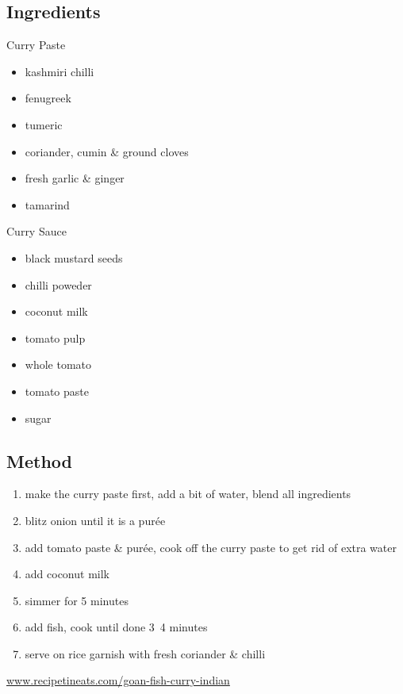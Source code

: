\documentclass[11pt,a4paper]{article}
\begin{document}
\subsection*{Ingredients}

\begin{multicols}{2}

Curry Paste

\begin{itemize}
  \item kashmiri chilli
  \item fenugreek
  \item tumeric
  \item coriander, cumin \& ground cloves
  \item fresh garlic \& ginger
  \item tamarind
\end{itemize}

\columnbreak

Curry Sauce

\begin{itemize}
  \item black mustard seeds
  \item chilli poweder
  \item coconut milk
  \item tomato pulp
  \item whole tomato
  \item tomato paste
  \item sugar
\end{itemize}

\end{multicols}

\medskip

\subsection*{Method}

\begin{enumerate}
  \item make the curry paste first, add a bit of water, blend all ingredients
  \item blitz onion until it is a purée
  \item add tomato paste \& purée, cook off the curry paste to get rid of extra water
  \item add coconut milk
  \item simmer for 5 minutes
  \item add fish, cook until done 3~4 minutes
  \item serve on rice garnish with fresh coriander \& chilli
\end{enumerate}

\href{https://www.recipetineats.com/goan-fish-curry-indian/}{www.recipetineats.com/goan-fish-curry-indian}
\end{document}

